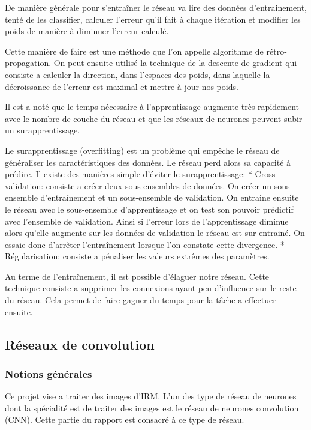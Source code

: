 \documentclass[a4paper,10pt,openany,oneside]{sphinxmanual}
\begin{document}
De manière générale pour s'entraîner le réseau va lire des données d'entrainement, tenté de les classifier, calculer l'erreur qu'il fait
à chaque itération et modifier les poids de manière à diminuer l'erreur calculé.

Cette manière de faire est une méthode que l'on appelle algorithme de rétro-propagation. On peut ensuite utilisé la technique de la descente de
gradient qui consiste a calculer la direction, dans l'espaces des poids, dans laquelle la décroissance de l'erreur est maximal et mettre à
jour nos poids.

Il est a noté que le temps nécessaire à l'apprentissage augmente très rapidement avec le nombre de couche du réseau et que les réseaux de
neurones peuvent subir un surapprentissage.

Le surapprentissage (overfitting) est un problème qui empêche le réseau de généraliser les caractéristiques des données. Le réseau
perd alors sa capacité à prédire. Il existe des manières simple d'éviter le surapprentissage:
* Cross-validation: consiste a créer deux sous-ensembles de données. On créer un sous-ensemble d'entraînement et un sous-ensemble de validation.
On entraine ensuite le réseau avec le sous-ensemble d'apprentissage et on test son pouvoir prédictif avec l'ensemble de validation. Ainsi si l'erreur lors
de l'apprentissage diminue alors qu'elle augmente sur les données de validation le réseau est sur-entrainé. On essaie donc d'arrêter l'entraînement
lorsque l'on constate cette divergence.
* Régularisation: consiste a pénaliser les valeurs extrêmes des paramètres.

Au terme de l'entraînement, il est possible d'élaguer notre réseau. Cette technique consiste a supprimer les connexions ayant peu d'influence
sur le reste du réseau. Cela permet de faire gagner du temps pour la tâche a effectuer ensuite.


\subsection{Réseaux de convolution}
\label{index:reseaux-de-convolution}

\subsubsection{Notions générales}
\label{index:notions-generales}
Ce projet vise a traiter des images d'IRM. L'un des type de réseau de neurones dont la spécialité est de traiter des images est le réseau de neurones
convolution (CNN). Cette partie du rapport est consacré à ce type de réseau.
\end{document}
